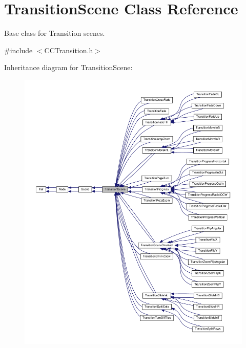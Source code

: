 \hypertarget{classTransitionScene}{}\section{Transition\+Scene Class Reference}
\label{classTransitionScene}


Base class for Transition scenes.  




{\ttfamily \#include $<$C\+C\+Transition.\+h$>$}



Inheritance diagram for Transition\+Scene\+:
\nopagebreak
\begin{figure}[H]
\begin{center}
\leavevmode
\includegraphics[width=350pt]{classTransitionScene__inherit__graph}
\end{center}
\end{figure}


